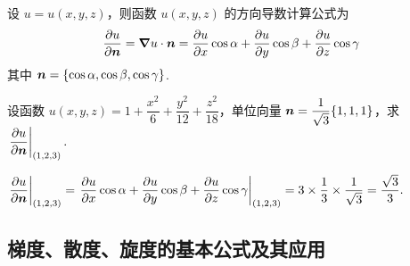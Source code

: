 \begin{theorem}
    设 $u=u(x,y,z)$，则函数 $u(x,y,z)$ 的方向导数计算公式为
    $$\pdv{u}{\vb*{n}}=\grad u\cdot\vb*{n}=\pdv{u}{x}\cos\alpha+\pdv{u}{y}\cos\beta+\pdv{u}{z}\cos\gamma$$
    其中 $\vb*{n}=\qty{\cos\alpha,\cos\beta,\cos\gamma}$.
\end{theorem}

\begin{example}[2005 数一]
    设函数 $u(x,y,z)=1+\dfrac{x^2}{6}+\dfrac{y^2}{12}+\dfrac{z^2}{18}$，单位向量 $\vb*{n}=\dfrac{1}{\sqrt{3}}\qty{1,1,1}$，求
    $\displaystyle \eval{\pdv{u}{\vb*{n}}}_{(1,2,3)}.$
\end{example}
\begin{solution}
    $\displaystyle\eval{\pdv{u}{\vb*{n}}}_{(1,2,3)}=\eval{\pdv{u}{x}\cos\alpha+\pdv{u}{y}\cos\beta+\pdv{u}{z}\cos\gamma}_{(1,2,3)}=3\times\dfrac{1}{3}\times\dfrac{1}{\sqrt{3}}=\dfrac{\sqrt{3}}{3}.$
\end{solution}

\subsection{梯度、散度、旋度的基本公式及其应用}

